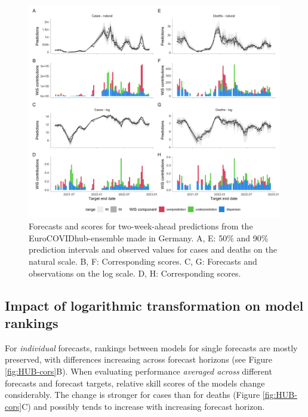 \documentclass{article}
\begin{document}

\begin{figure}[h!]
    \centering
    \includegraphics[width=0.99\textwidth]{output/figures/HUB-model-comparison-ensemble.png}
    \caption{
    Forecasts and scores for two-week-ahead predictions from the EuroCOVIDhub-ensemble made in Germany. A, E: 50\% and 90\% prediction intervals and observed values for cases and deaths on the natural scale. B, F: Corresponding scores. C, G: Forecasts and observations on the log scale. D, H: Corresponding scores. 
    }
    \label{fig:HUB-model-comparison-ensemble}
\end{figure}

\subsection{Impact of logarithmic transformation on model rankings}

For \textit{individual} forecasts, rankings between models for single forecasts are mostly preserved, with differences increasing across forecast horizons (see Figure \ref{fig:HUB-cors}B). When evaluating performance \textit{averaged across} different forecasts and forecast targets, relative skill scores of the models change considerably. The change is stronger for cases than for deaths (Figure \ref{fig:HUB-cors}C) and possibly tends to increase with increasing forecast horizon. 
\end{document}
